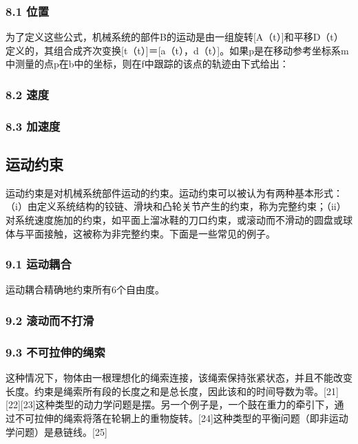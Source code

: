 \subsubsection{8.1 位置}

为了定义这些公式，机械系统的部件B的运动是由一组旋转[A（t）]和平移D（t）定义的，其组合成齐次变换[t（t）]＝[a（t），d（t）]。如果p是在移动参考坐标系m中测量的点p在b中的坐标，则在f中跟踪的该点的轨迹由下式给出：

\subsubsection{8.2 速度}



\subsubsection{8.3 加速度}



\subsection{运动约束}

运动约束是对机械系统部件运动的约束。运动约束可以被认为有两种基本形式：（i）由定义系统结构的铰链、滑块和凸轮关节产生的约束，称为完整约束；（ii）对系统速度施加的约束，如平面上溜冰鞋的刀口约束，或滚动而不滑动的圆盘或球体与平面接触，这被称为非完整约束。下面是一些常见的例子。

\subsubsection{9.1 运动耦合}

运动耦合精确地约束所有6个自由度。

\subsubsection{9.2 滚动而不打滑}



\subsubsection{9.3 不可拉伸的绳索}

这种情况下，物体由一根理想化的绳索连接，该绳索保持张紧状态，并且不能改变长度。约束是绳索所有段的长度之和是总长度，因此该和的时间导数为零。[21][22][23]这种类型的动力学问题是摆。另一个例子是，一个鼓在重力的牵引下，通过不可拉伸的绳索将落在轮辋上的重物旋转。[24]这种类型的平衡问题（即非运动学问题）是悬链线。[25]

